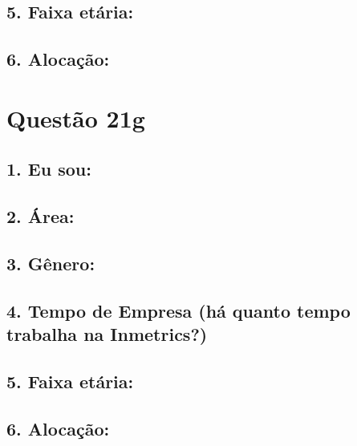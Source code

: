 \documentclass[]{book}
\begin{document}
\hypertarget{faixa-etaria-66}{%
\subsection{5. Faixa etária:}\label{faixa-etaria-66}}

\hypertarget{alocacao-66}{%
\subsection{6. Alocação:}\label{alocacao-66}}

\hypertarget{questao-21g}{%
\section{Questão 21g}\label{questao-21g}}

\hypertarget{eu-sou-67}{%
\subsection{1. Eu sou:}\label{eu-sou-67}}

\hypertarget{area-67}{%
\subsection{2. Área:}\label{area-67}}

\hypertarget{genero-67}{%
\subsection{3. Gênero:}\label{genero-67}}

\hypertarget{tempo-de-empresa-ha-quanto-tempo-trabalha-na-inmetrics-67}{%
\subsection{4. Tempo de Empresa (há quanto tempo trabalha na Inmetrics?)}\label{tempo-de-empresa-ha-quanto-tempo-trabalha-na-inmetrics-67}}

\hypertarget{faixa-etaria-67}{%
\subsection{5. Faixa etária:}\label{faixa-etaria-67}}

\hypertarget{alocacao-67}{%
\subsection{6. Alocação:}\label{alocacao-67}}
\end{document}
